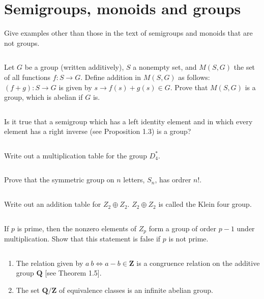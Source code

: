 \section{Semigroups, monoids and groups}
\begin{ex}
    Give examples other than those in the text of semigroups and monoids that are not groups.
\end{ex}

$$ $$

\begin{ex}
    Let $G$ be a group (written additively), $S$ a nonempty set, and $M(S,G)$ the set of all functions $f: S \rightarrow G$. Define addition in $M(S,G)$ as follows: $(f + g) : S \rightarrow G$ is given by $s \rightarrow f(s) + g(s) \in G$. Prove that $M(S,G)$ is a group, which is abelian if $G$ is.
\end{ex}

$$ $$

\begin{ex}
    Is it true that a semigroup which has a left identity element and in which every element has a right inverse (see Proposition 1.3) is a group?
\end{ex}

$$ $$

\begin{ex}
    Write out a multiplication table for the group $D_4^*$.
\end{ex}

$$ $$

\begin{ex}
    Prove that the symmetric group on $n$ letters, $S_n$, has ordrer $n!$.
\end{ex}

$$ $$

\begin{ex}
    Write out an addition table for $Z_2\oplus Z_2$. $Z_2\oplus Z_2$ is called the Klein four group.
\end{ex}

$$ $$

\begin{ex}
    If $p$ is prime, then the nonzero elements of $Z_p$ form a group of order $p - 1$ under multiplication. Show that this statement is false if $p$ is not prime.
\end{ex}

$$ $$

\begin{ex}
    \begin{enumerate}
        \item The relation given by $a ~ b \Leftrightarrow a - b \in \mathbf{Z}$ is a congruence relation on the additive group $\mathbf{Q}$ [see Theorem 1.5].
        \item The set $\mathbf{Q}/\mathbf{Z}$ of equivalence classes is an infinite abelian group.
    \end{enumerate}
\end{ex}

